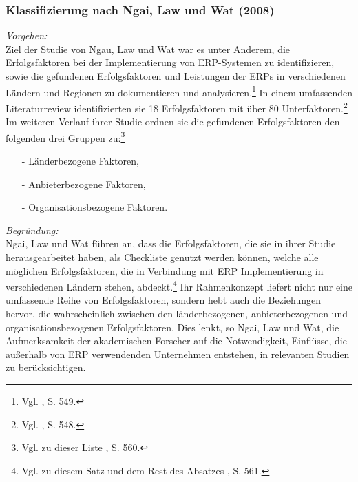 \noindent
\subsubsection{Klassifizierung nach Ngai, Law und Wat (2008)}
\textit{Vorgehen:}\\\noindent
Ziel der Studie von Ngau, Law und Wat war es unter Anderem, die Erfolgsfaktoren bei der Implementierung von ERP-Systemen zu identifizieren, sowie die gefundenen Erfolgsfaktoren und Leistungen der ERPs in verschiedenen Ländern und Regionen zu dokumentieren und analysieren.\footnote{Vgl. \cite{}, S. 549.}
In einem umfassenden Literaturreview identifizierten sie 18 Erfolgsfaktoren mit über 80 Unterfaktoren.\footnote{Vgl. \cite{}, S. 548.}
Im weiteren Verlauf ihrer Studie ordnen sie die gefundenen Erfolgsfaktoren den folgenden drei Gruppen zu:\footnote{Vgl. zu dieser Liste \cite{}, S. 560.}
\begin{itemize}\itemsep0pt
\item[-]Länderbezogene Faktoren,
\item[-]Anbieterbezogene Faktoren,
\item[-]Organisationsbezogene Faktoren.
\end{itemize}
\textit{Begründung:}\\\noindent
Ngai, Law und Wat führen an, dass die Erfolgsfaktoren, die sie in ihrer Studie herausgearbeitet haben, als Checkliste genutzt werden können, welche alle möglichen Erfolgsfaktoren, die in Verbindung mit ERP Implementierung in verschiedenen Ländern stehen, abdeckt.\footnote{Vgl. zu diesem Satz und dem Rest des Absatzes \cite{}, S. 561.}
Ihr Rahmenkonzept liefert nicht nur eine umfassende Reihe von Erfolgsfaktoren, sondern hebt auch die Beziehungen hervor, die wahrscheinlich zwischen den länderbezogenen, anbieterbezogenen und organisationsbezogenen Erfolgsfaktoren. Dies lenkt, so Ngai, Law und Wat, die Aufmerksamkeit der akademischen Forscher auf die Notwendigkeit, Einflüsse, die außerhalb von ERP verwendenden Unternehmen entstehen, in relevanten Studien zu berücksichtigen.